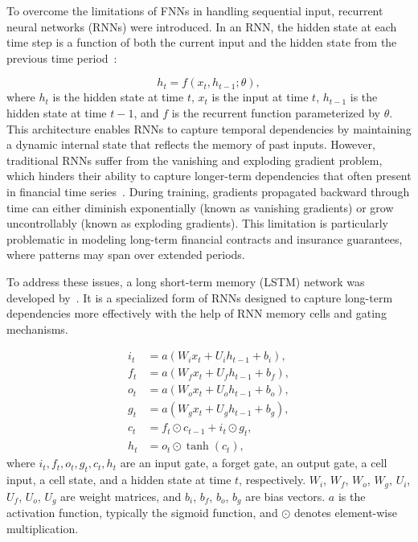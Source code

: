 To overcome the limitations of FNNs in handling sequential input, recurrent neural networks (RNNs) were introduced.
In an RNN, the hidden state at each time step is a function of both the current input and the hidden state from the previous time period~\citep{elman1990finding}:

\begin{equation}
    h_t = f(x_t, h_{t-1}; \theta),
\end{equation}
where $h_t$ is the hidden state at time $t$, $x_t$ is the input at time $t$, $h_{t-1}$ is the hidden state at time $t-1$, and $f$ is the recurrent function parameterized by $\theta$.
This architecture enables RNNs to capture temporal dependencies by maintaining a dynamic internal state that reflects the memory of past inputs.
However, traditional RNNs suffer from the vanishing and exploding gradient problem, which hinders their ability to capture longer-term dependencies that often present in financial time series~\citep{bengio1994learning}.
During training, gradients propagated backward through time can either diminish exponentially (known as vanishing gradients) or grow uncontrollably (known as exploding gradients).
This limitation is particularly problematic in modeling long-term financial contracts and insurance guarantees, where patterns may span over extended periods.

To address these issues, a long short-term memory (LSTM) network was developed by~\citet{hochreiter1997long}.
It is a specialized form of RNNs designed to capture long-term dependencies more effectively with the help of RNN memory cells and gating mechanisms.

\begin{align*}
    i_t &= a(W_i x_t + U_i h_{t-1} + b_i), \\
    f_t &= a(W_f x_t + U_f h_{t-1} + b_f), \\
    o_t &= a(W_o x_t + U_o h_{t-1} + b_o), \\
    g_t &= a(W_g x_t + U_g h_{t-1} + b_g), \\
    c_t &= f_t \odot c_{t-1} + i_t \odot g_t, \\
    h_t &= o_t \odot \tanh(c_t),
\end{align*}
where $i_t, f_t, o_t, g_t, c_t, h_t$ are an input gate, a forget gate, an output gate, a cell input, a cell state, and a hidden state at time $t$, respectively.
$W_i$, $W_f$, $W_o$, $W_g$, $U_i$, $U_f$, $U_o$, $U_g$ are weight matrices, and $b_i$, $b_f$, $b_o$, $b_g$ are bias vectors.
$a$ is the activation function, typically the sigmoid function, and $\odot$ denotes element-wise multiplication.

